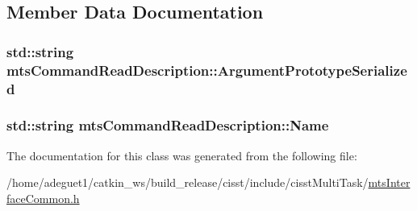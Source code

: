 \subsection{Member Data Documentation}
\hypertarget{classmts_command_read_description_a59ef21dc113e6263dde1e81f0b1bdc31}{
\subsubsection[{Argument\-Prototype\-Serialized}]{\setlength{\rightskip}{0pt plus 5cm}std\-::string mts\-Command\-Read\-Description\-::\-Argument\-Prototype\-Serialized}}\label{classmts_command_read_description_a59ef21dc113e6263dde1e81f0b1bdc31}
\hypertarget{classmts_command_read_description_a6a4939db07848192ec849d2c192c3aba}{
\subsubsection[{Name}]{\setlength{\rightskip}{0pt plus 5cm}std\-::string mts\-Command\-Read\-Description\-::\-Name}}\label{classmts_command_read_description_a6a4939db07848192ec849d2c192c3aba}


The documentation for this class was generated from the following file\-:\begin{DoxyCompactItemize}
\item 
/home/adeguet1/catkin\-\_\-ws/build\-\_\-release/cisst/include/cisst\-Multi\-Task/\hyperlink{mts_interface_common_8h}{mts\-Interface\-Common.\-h}\end{DoxyCompactItemize}
